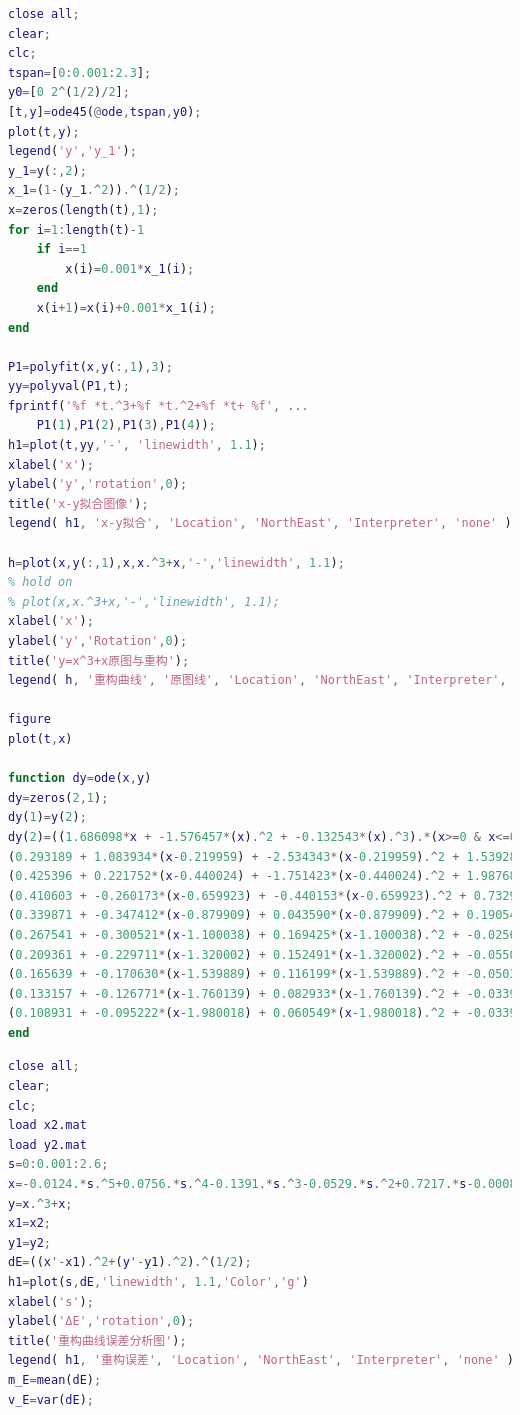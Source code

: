 \documentclass[withoutpreface,bwprint]{cumcmthesis}
\begin{document}
 \begin{lstlisting}[language=Matlab] 
%s-k得x-y，龙格-库塔法
close all;
clear;
clc;
tspan=[0:0.001:2.3];
y0=[0 2^(1/2)/2];
[t,y]=ode45(@ode,tspan,y0);
plot(t,y);
legend('y','y_1');
y_1=y(:,2);
x_1=(1-(y_1.^2)).^(1/2);
x=zeros(length(t),1);
for i=1:length(t)-1
    if i==1
        x(i)=0.001*x_1(i);
    end
    x(i+1)=x(i)+0.001*x_1(i);
end

P1=polyfit(x,y(:,1),3);
yy=polyval(P1,t);
fprintf('%f *t.^3+%f *t.^2+%f *t+ %f', ...
    P1(1),P1(2),P1(3),P1(4));
h1=plot(t,yy,'-', 'linewidth', 1.1);
xlabel('x');
ylabel('y','rotation',0);
title('x-y拟合图像');
legend( h1, 'x-y拟合', 'Location', 'NorthEast', 'Interpreter', 'none' );

h=plot(x,y(:,1),x,x.^3+x,'-','linewidth', 1.1);
% hold on
% plot(x,x.^3+x,'-','linewidth', 1.1);
xlabel('x');
ylabel('y','Rotation',0);
title('y=x^3+x原图与重构');
legend( h, '重构曲线', '原图线', 'Location', 'NorthEast', 'Interpreter', 'none' );

figure
plot(t,x)

function dy=ode(x,y)
dy=zeros(2,1);
dy(1)=y(2);
dy(2)=((1.686098*x + -1.576457*(x).^2 + -0.132543*(x).^3).*(x>=0 & x<=0.219959)+...
(0.293189 + 1.083934*(x-0.219959) + -2.534343*(x-0.219959).^2 + 1.539284*(x-0.219959).^3).*(x>0.219959 & x<=0.440024)+...
(0.425396 + 0.221752*(x-0.440024) + -1.751423*(x-0.440024).^2 + 1.987685*(x-0.440024).^3).*(x>0.440024 & x<=0.659923)+...
(0.410603 + -0.260173*(x-0.659923) + -0.440153*(x-0.659923).^2 + 0.732988*(x-0.659923).^3).*(x>0.659923 & x<=0.879909)+...
(0.339871 + -0.347412*(x-0.879909) + 0.043590*(x-0.879909).^2 + 0.190548*(x-0.879909).^3).*(x>0.879909 & x<=1.100038)+...
(0.267541 + -0.300521*(x-1.100038) + 0.169425*(x-1.100038).^2 + -0.025663*(x-1.100038).^3).*(x>1.100038 & x<=1.320002)+...
(0.209361 + -0.229711*(x-1.320002) + 0.152491*(x-1.320002).^2 + -0.055016*(x-1.320002).^3).*(x>1.320002 & x<=1.539889)+...
(0.165639 + -0.170630*(x-1.539889) + 0.116199*(x-1.539889).^2 + -0.050345*(x-1.539889).^3).*(x>1.539889 & x<=1.760139)+...
(0.133157 + -0.126771*(x-1.760139) + 0.082933*(x-1.760139).^2 + -0.033934*(x-1.760139).^3).*(x>1.760139 & x<=1.980018)+...
(0.108931 + -0.095222*(x-1.980018) + 0.060549*(x-1.980018).^2 + -0.033934*(x-1.980018).^3).*(x>1.980018 & x<=2.199865))*(1-y(2)^2)^(1/2);
end
 \end{lstlisting}
 
 \begin{lstlisting}[language=Matlab] 
%重构y=x^3+x曲线误差分析
close all;
clear;
clc;
load x2.mat
load y2.mat
s=0:0.001:2.6;
x=-0.0124.*s.^5+0.0756.*s.^4-0.1391.*s.^3-0.0529.*s.^2+0.7217.*s-0.0008;
y=x.^3+x;
x1=x2;
y1=y2;
dE=((x'-x1).^2+(y'-y1).^2).^(1/2);
h1=plot(s,dE,'linewidth', 1.1,'Color','g')
xlabel('s');
ylabel('ΔE','rotation',0);
title('重构曲线误差分析图');
legend( h1, '重构误差', 'Location', 'NorthEast', 'Interpreter', 'none' );
m_E=mean(dE);
v_E=var(dE);
 \end{lstlisting}
 
\end{document}
